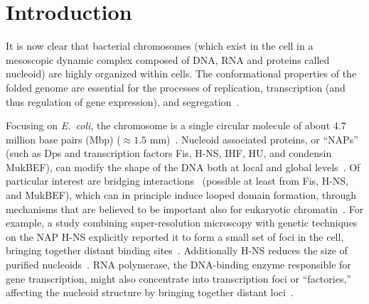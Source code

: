 \documentclass[
preprint,
a4paper,
12pt,
superscriptaddress,
pre]{revtex4}
\begin{document}
\maketitle




\section{Introduction} 

%

It is now clear that bacterial chromosomes (which exist in the cell in
a mesoscopic dynamic complex composed of DNA, RNA and proteins called
nucleoid) are highly organized within cells. The conformational
properties of the folded genome are essential for the processes of
replication, transcription (and thus regulation of gene expression),
and segregation~\cite{Benza2012,Dillon2010,Muskhelishvili2010}.


Focusing on \emph{E.~coli}, the chromosome is a single circular
molecule of about $4.7$ million base pairs (Mbp) ($\approx1.5$
mm)~\cite{Trun1998,Stavans2006}. Nucleoid associated proteins, or
``NAPs'' (such as Dps and transcription factors Fis, H-NS, IHF, HU,
and condensin MukBEF), can modify the shape of the DNA both at local
and global levels~\cite{Dillon2010,LNW+06,Ohniwa2011}.
%
Of particular interest are bridging interactions~\cite{Wiggins2009}
(possible at least from Fis, H-NS, and MukBEF), which can in principle
induce looped domain formation, through mechanisms that are believed
to be important also for eukaryotic
chromatin~\cite{Brackley2013,Barbieri2013b}.  For example, a study
combining super-resolution microscopy with genetic techniques on the
NAP H-NS explicitly reported it to form a small set of foci in the
cell, bringing together distant binding
sites~\cite{Wang2011a}. Additionally H-NS
reduces the size of purified nucleoids~\cite{Thacker2013}.
RNA polymerase, the DNA-binding enzyme responsible for gene
transcription, might also concentrate into transcription foci or
``factories,'' affecting the nucleoid structure by bringing together
distant loci~\cite{JC06,GHH+05}.
\end{document}
